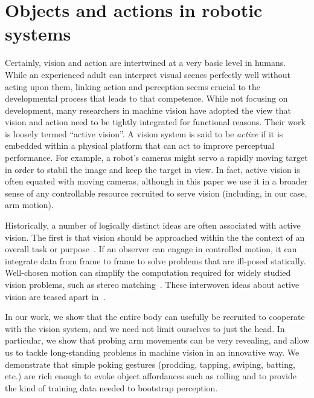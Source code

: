 \section{Objects and actions in robotic systems}

Certainly, vision and action are intertwined at a very basic level in
humans.  While an experienced adult can interpret visual scenes
perfectly well without acting upon them, linking action and perception
seems crucial to the developmental process that leads to that
competence.  While not focusing on development, many researchers in
machine vision have adopted the view that vision and action need to be
tightly integrated for functional reasons.  Their work is loosely
termed ``active vision''.
%
A vision system is said to be {\em active} if it is embedded within a
physical platform that can act to improve perceptual performance.  For
example, a robot's cameras might servo a rapidly moving target in order to
stabil\ize{} the image and keep the target in view.  In fact, active
vision is often equated with moving cameras, although in this paper we
use it in a broader sense of any controllable resource recruited to
serve vision (including, in our case, arm motion).

Historically, a number of logically distinct ideas are often
associated with active vision.  The first is that vision should be
approached within the the context of an overall task or
purpose~\cite{aloimonos87active}.  If an observer can engage in
controlled motion, it can integrate data from frame to frame to solve
problems that are ill-posed statically.  Well-chosen motion can
simplify the computation required for widely studied vision problems,
such as stereo matching~\cite{bajcsy88active,ballard91animate}.  These
interwoven ideas about active vision are teased apart
in~\cite{tarr94computational}.  

In our work, we show that the entire body can usefully be recruited to
cooperate with the vision system, and we need not limit ourselves to
just the head.  In particular, we show that probing arm movements
can be very revealing, and allow us to tackle long-standing problems 
in machine vision in an innovative way.
We demonstrate that simple poking gestures
(prodding, tapping, swiping, batting, etc.) are rich enough 
to evoke object affordances such as rolling and to provide
the kind of training data needed to bootstrap perception.

